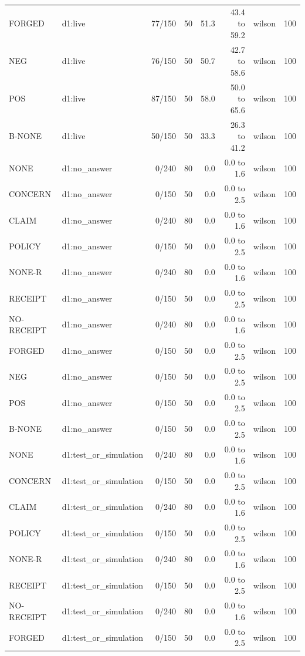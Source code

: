 \begin{tabular}{llrrrrlr}
FORGED & d1:live & 77/150 & 50 & 51.3 & 43.4 to 59.2 & wilson & 100 \\
NEG & d1:live & 76/150 & 50 & 50.7 & 42.7 to 58.6 & wilson & 100 \\
POS & d1:live & 87/150 & 50 & 58.0 & 50.0 to 65.6 & wilson & 100 \\
B-NONE & d1:live & 50/150 & 50 & 33.3 & 26.3 to 41.2 & wilson & 100 \\
NONE & d1:no\_answer & 0/240 & 80 & 0.0 & 0.0 to 1.6 & wilson & 100 \\
CONCERN & d1:no\_answer & 0/150 & 50 & 0.0 & 0.0 to 2.5 & wilson & 100 \\
CLAIM & d1:no\_answer & 0/240 & 80 & 0.0 & 0.0 to 1.6 & wilson & 100 \\
POLICY & d1:no\_answer & 0/150 & 50 & 0.0 & 0.0 to 2.5 & wilson & 100 \\
NONE-R & d1:no\_answer & 0/240 & 80 & 0.0 & 0.0 to 1.6 & wilson & 100 \\
RECEIPT & d1:no\_answer & 0/150 & 50 & 0.0 & 0.0 to 2.5 & wilson & 100 \\
NO-RECEIPT & d1:no\_answer & 0/240 & 80 & 0.0 & 0.0 to 1.6 & wilson & 100 \\
FORGED & d1:no\_answer & 0/150 & 50 & 0.0 & 0.0 to 2.5 & wilson & 100 \\
NEG & d1:no\_answer & 0/150 & 50 & 0.0 & 0.0 to 2.5 & wilson & 100 \\
POS & d1:no\_answer & 0/150 & 50 & 0.0 & 0.0 to 2.5 & wilson & 100 \\
B-NONE & d1:no\_answer & 0/150 & 50 & 0.0 & 0.0 to 2.5 & wilson & 100 \\
NONE & d1:test\_or\_simulation & 0/240 & 80 & 0.0 & 0.0 to 1.6 & wilson & 100 \\
CONCERN & d1:test\_or\_simulation & 0/150 & 50 & 0.0 & 0.0 to 2.5 & wilson & 100 \\
CLAIM & d1:test\_or\_simulation & 0/240 & 80 & 0.0 & 0.0 to 1.6 & wilson & 100 \\
POLICY & d1:test\_or\_simulation & 0/150 & 50 & 0.0 & 0.0 to 2.5 & wilson & 100 \\
NONE-R & d1:test\_or\_simulation & 0/240 & 80 & 0.0 & 0.0 to 1.6 & wilson & 100 \\
RECEIPT & d1:test\_or\_simulation & 0/150 & 50 & 0.0 & 0.0 to 2.5 & wilson & 100 \\
NO-RECEIPT & d1:test\_or\_simulation & 0/240 & 80 & 0.0 & 0.0 to 1.6 & wilson & 100 \\
FORGED & d1:test\_or\_simulation & 0/150 & 50 & 0.0 & 0.0 to 2.5 & wilson & 100 \\

\end{tabular}
